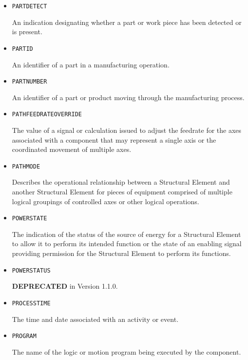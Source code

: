 \begin{itemize}
\item \texttt{PART\textunderscore DETECT}  

An indication designating whether a part or work piece has been detected or is present.


\item \texttt{PART\textunderscore ID}  

An identifier of a part in a manufacturing operation.


\item \texttt{PART\textunderscore NUMBER}  

An identifier of a part or product moving through the manufacturing process.


\item \texttt{PATH\textunderscore FEEDRATE\textunderscore OVERRIDE}  

The value of a signal or calculation issued to adjust the feedrate for the axes associated with a  component that may represent a single axis or the coordinated movement of multiple axes.


\item \texttt{PATH\textunderscore MODE}  

Describes the operational relationship between a  \gls{Structural Element} and another  \gls{Structural Element} for pieces of equipment comprised of multiple logical groupings of controlled axes or other logical operations.


\item \texttt{POWER\textunderscore STATE}  

The indication of the status of the source of energy for a \gls{Structural Element} to allow it to perform its intended function or the state of an enabling signal providing permission for the \gls{Structural Element} to perform its functions.


\item \texttt{POWER\textunderscore STATUS}  

\textbf{DEPRECATED} in Version 1.1.0.


\item \texttt{PROCESS\textunderscore TIME}  

The time and date associated with an activity or event.


\item \texttt{PROGRAM}  

The name of the logic or motion program being executed by the  component.



\end{itemize}
